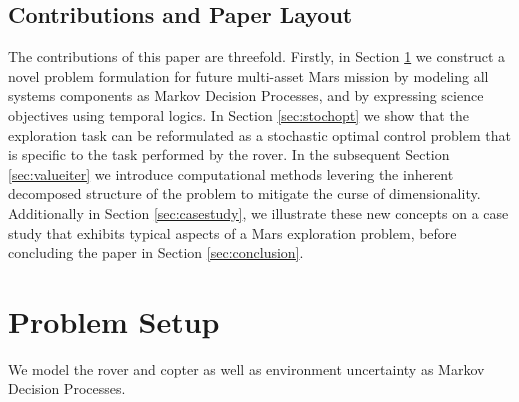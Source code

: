 \documentclass[conference]{IEEEtran}
\begin{document}
\subsection{Contributions and Paper Layout}

The contributions of this paper are threefold. Firstly, in Section \ref{sec:problem} we construct a novel problem formulation for future multi-asset Mars mission by modeling all systems components as Markov Decision Processes, and by expressing science objectives using temporal logics. In Section \ref{sec:stochopt} we show that the exploration task can be reformulated as a stochastic optimal control problem that is specific to the task performed by the rover. In the subsequent Section \ref{sec:valueiter} we introduce computational methods levering the inherent decomposed structure of the problem to mitigate the curse of dimensionality. Additionally in Section \ref{sec:casestudy}, we illustrate these new concepts on a case study that exhibits typical aspects of a Mars exploration problem, before concluding the paper in Section \ref{sec:conclusion}.


\section{Problem Setup}
\label{sec:problem}

We model the rover and copter as well as environment uncertainty as Markov Decision Processes. 
\end{document}
